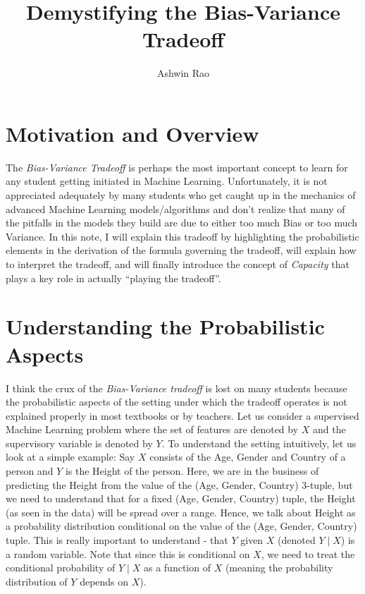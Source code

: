 \documentclass[11pt]{article}   	%
\title{Demystifying the Bias-Variance Tradeoff}
\author{Ashwin Rao}
\begin{document}
\maketitle

\section{Motivation and Overview}

The {\em Bias-Variance Tradeoff} is perhaps the most important concept to learn for any student getting initiated in Machine Learning. Unfortunately, it is not appreciated adequately by many students who get caught up in the mechanics of advanced Machine Learning models/algorithms and don't realize that many of the pitfalls in the models they build are due to either too much Bias or too much Variance. In this note, I will explain this tradeoff by highlighting the probabilistic elements in the derivation of the formula governing the tradeoff, will explain how to interpret the tradeoff, and will finally introduce the concept of {\em Capacity} that plays a key role in actually ``playing the tradeoff''.

\section{Understanding the Probabilistic Aspects}
I think the crux of the {\em Bias-Variance tradeoff} is lost on many students because the probabilistic aspects of the setting under which the tradeoff operates is not explained properly in most textbooks or by teachers. Let us consider a supervised Machine Learning problem where the set of features are denoted by $X$ and the supervisory variable is denoted by $Y$. To understand the setting intuitively, let us look at a simple example: Say $X$ consists of the Age, Gender and Country of a person and $Y$ is the Height of the person. Here, we are in the business of predicting the Height from the value of the (Age, Gender, Country) 3-tuple, but we need to understand that for a fixed (Age, Gender, Country) tuple, the Height (as seen in the data) will be spread over a range. Hence, we talk about Height as a probability distribution conditional on the value of the (Age, Gender, Country) tuple. This is really important to understand - that $Y$ given $X$ (denoted $Y \mid X$) is a random variable. Note that since this is conditional on $X$, we need to treat the conditional probability of $Y \mid X$ as a function of $X$ (meaning the probability distribution of $Y$ depends on $X$). 
\end{document}
